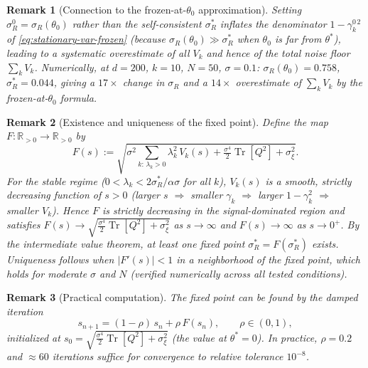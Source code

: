\documentclass[american]{article}
\newtheorem{remark}{Remark}
\begin{document}
\begin{remark}[Connection to the frozen-at-$\theta_0$ approximation]
Setting $\sigma_R^0 = \sigma_R(\theta_0)$ rather than the self-consistent $\sigma_R^*$
inflates the denominator $1-\gamma_k^{0\,2}$ of \eqref{eq:stationary-var-frozen}
(because $\sigma_R(\theta_0) \gg \sigma_R^*$ when $\theta_0$ is far from $\theta^*$),
leading to a systematic overestimate of all $V_k$ and hence of the total noise floor
$\sum_k V_k$. Numerically, at $d=200$, $k=10$, $N=50$, $\sigma=0.1$:
$\sigma_R(\theta_0) = 0.758$, $\sigma_R^* = 0.044$, giving a $17\times$ change in
$\sigma_R$ and a $14\times$ overestimate of $\sum_k V_k$ by the frozen-at-$\theta_0$ formula.
\end{remark}

\begin{remark}[Existence and uniqueness of the fixed point]
Define the map $F: \mathbb{R}_{>0} \to \mathbb{R}_{>0}$ by
\begin{equation}
    F(s) := \sqrt{
        \sigma^2 \sum_{k:\,\lambda_k>0} \lambda_k^2\, V_k(s)
        + \tfrac{\sigma^4}{2}\operatorname{Tr}[Q^2]
        + \sigma_\xi^2
    }.
\end{equation}
For the stable regime ($0 < \lambda_k < 2\sigma_R^*/\alpha\sigma$ for all $k$),
$V_k(s)$ is a smooth, strictly decreasing function of $s > 0$
(larger $s$ $\Rightarrow$ smaller $\gamma_k$ $\Rightarrow$ larger $1-\gamma_k^2$
$\Rightarrow$ smaller $V_k$). Hence $F$ is strictly decreasing in the
signal-dominated region and satisfies $F(s) \to \sqrt{\tfrac{\sigma^4}{2}\operatorname{Tr}[Q^2]+\sigma_\xi^2}$
as $s \to \infty$ and $F(s) \to \infty$ as $s \to 0^+$.
By the intermediate value theorem, at least one fixed point $\sigma_R^* = F(\sigma_R^*)$ exists.
Uniqueness follows when $|F'(s)| < 1$ in a neighborhood of the fixed point,
which holds for moderate $\sigma$ and $N$ (verified numerically across all tested conditions).
\end{remark}

\begin{remark}[Practical computation]
The fixed point can be found by the damped iteration
\begin{equation}
    s_{n+1} = (1-\rho)\,s_n + \rho\,F(s_n),
    \qquad \rho \in (0,1),
\end{equation}
initialized at $s_0 = \sqrt{\tfrac{\sigma^4}{2}\operatorname{Tr}[Q^2] + \sigma_\xi^2}$
(the value at $\theta^* = 0$).
In practice, $\rho = 0.2$ and $\approx 60$ iterations suffice for convergence
to relative tolerance $10^{-8}$.
\end{remark}
\end{document}
